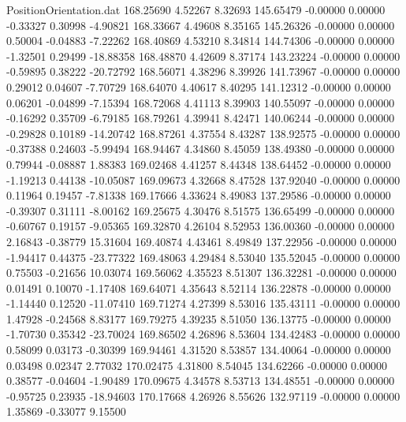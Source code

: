 \begin{filecontents}{PositionOrientation.dat}
 168.25690    4.52267    8.32693   145.65479   -0.00000    0.00000   -0.33327    0.30998   -4.90821
 168.33667    4.49608    8.35165   145.26326   -0.00000    0.00000    0.50004   -0.04883   -7.22262
 168.40869    4.53210    8.34814   144.74306   -0.00000    0.00000   -1.32501    0.29499  -18.88358
 168.48870    4.42609    8.37174   143.23224   -0.00000    0.00000   -0.59895    0.38222  -20.72792
 168.56071    4.38296    8.39926   141.73967   -0.00000    0.00000    0.29012    0.04607   -7.70729
 168.64070    4.40617    8.40295   141.12312   -0.00000    0.00000    0.06201   -0.04899   -7.15394
 168.72068    4.41113    8.39903   140.55097   -0.00000    0.00000   -0.16292    0.35709   -6.79185
 168.79261    4.39941    8.42471   140.06244   -0.00000    0.00000   -0.29828    0.10189  -14.20742
 168.87261    4.37554    8.43287   138.92575   -0.00000    0.00000   -0.37388    0.24603   -5.99494
 168.94467    4.34860    8.45059   138.49380   -0.00000    0.00000    0.79944   -0.08887    1.88383
 169.02468    4.41257    8.44348   138.64452   -0.00000    0.00000   -1.19213    0.44138  -10.05087
 169.09673    4.32668    8.47528   137.92040   -0.00000    0.00000    0.11964    0.19457   -7.81338
 169.17666    4.33624    8.49083   137.29586   -0.00000    0.00000   -0.39307    0.31111   -8.00162
 169.25675    4.30476    8.51575   136.65499   -0.00000    0.00000   -0.60767    0.19157   -9.05365
 169.32870    4.26104    8.52953   136.00360   -0.00000    0.00000    2.16843   -0.38779   15.31604
 169.40874    4.43461    8.49849   137.22956   -0.00000    0.00000   -1.94417    0.44375  -23.77322
 169.48063    4.29484    8.53040   135.52045   -0.00000    0.00000    0.75503   -0.21656   10.03074
 169.56062    4.35523    8.51307   136.32281   -0.00000    0.00000    0.01491    0.10070   -1.17408
 169.64071    4.35643    8.52114   136.22878   -0.00000    0.00000   -1.14440    0.12520  -11.07410
 169.71274    4.27399    8.53016   135.43111   -0.00000    0.00000    1.47928   -0.24568    8.83177
 169.79275    4.39235    8.51050   136.13775   -0.00000    0.00000   -1.70730    0.35342  -23.70024
 169.86502    4.26896    8.53604   134.42483   -0.00000    0.00000    0.58099    0.03173   -0.30399
 169.94461    4.31520    8.53857   134.40064   -0.00000    0.00000    0.03498    0.02347    2.77032
 170.02475    4.31800    8.54045   134.62266   -0.00000    0.00000    0.38577   -0.04604   -1.90489
 170.09675    4.34578    8.53713   134.48551   -0.00000    0.00000   -0.95725    0.23935  -18.94603
 170.17668    4.26926    8.55626   132.97119   -0.00000    0.00000    1.35869   -0.33077    9.15500

\end{filecontents}
